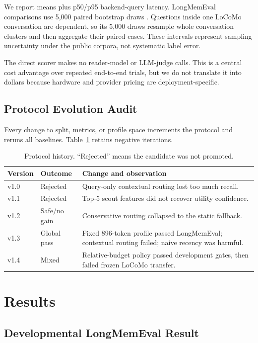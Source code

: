 \documentclass[10pt]{article}
\begin{document}
We report means plus p50/p95 backend-query latency. LongMemEval comparisons use
5,000 paired bootstrap draws \citep{efron1993bootstrap}. Questions inside one
LoCoMo conversation are dependent, so its 5,000 draws resample whole
conversation clusters and then aggregate their paired cases. These intervals
represent sampling uncertainty under the public corpora, not systematic label
error.

The direct scorer makes no reader-model or LLM-judge calls. This is a central
cost advantage over repeated end-to-end trials, but we do not translate it into
dollars because hardware and provider pricing are deployment-specific.

\subsection{Protocol Evolution Audit}

Every change to split, metrics, or profile space increments the protocol and
reruns all baselines. Table~\ref{tab:history} retains negative iterations.

\begin{table}[t]
\centering
\small
\caption{Protocol history. ``Rejected'' means the candidate was not promoted.}
\label{tab:history}
\begin{tabularx}{\textwidth}{@{}llX@{}}
\toprule
Version & Outcome & Change and observation \\
\midrule
v1.0 & Rejected & Query-only contextual routing lost too much recall. \\
v1.1 & Rejected & Top-5 scout features did not recover utility confidence. \\
v1.2 & Safe/no gain & Conservative routing collapsed to the static fallback. \\
v1.3 & Global pass & Fixed 896-token profile passed LongMemEval; contextual routing failed; naive recency was harmful. \\
v1.4 & Mixed & Relative-budget policy passed development gates, then failed frozen LoCoMo transfer. \\
\bottomrule
\end{tabularx}
\end{table}

\section{Results}

\subsection{Developmental LongMemEval Result}
\end{document}
